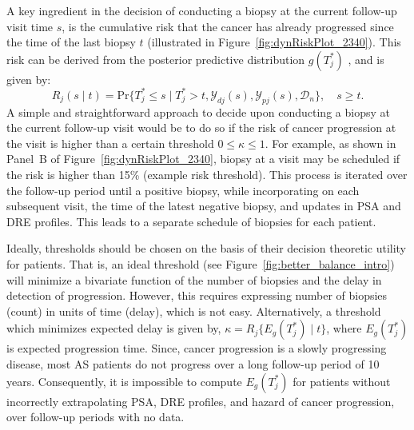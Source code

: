 A key ingredient in the decision of conducting a biopsy at the current follow-up visit time $s$, is the cumulative risk that the cancer has already progressed since the time of the last biopsy $t$ (illustrated in Figure~\ref{fig:dynRiskPlot_2340}). This risk can be derived from the posterior predictive distribution $g(T^*_j)$ \cite{rizopoulos2011dynamic}, and is given by:
\begin{equation*}
\label{eq:dynamic_risk_prob}
R_j(s \mid t) = \mbox{Pr}\big\{T^*_j \leq s \mid T^*_j > t, \mathcal{Y}_{dj}(s), \mathcal{Y}_{pj}(s), \mathcal{D}_n\big\}, \quad s \geq t.
\end{equation*}
A simple and straightforward approach to decide upon conducting a biopsy at the current follow-up visit would be to do so if the risk of cancer progression at the visit is higher than a certain threshold $0 \leq \kappa \leq 1$. For example, as shown in Panel~B of Figure~\ref{fig:dynRiskPlot_2340}, biopsy at a visit may be scheduled if the risk is higher than 15\% (example risk threshold). This process is iterated over the follow-up period until a positive biopsy, while incorporating on each subsequent visit, the time of the latest negative biopsy, and updates in PSA and DRE profiles. This leads to a separate schedule of biopsies for each patient.

Ideally, thresholds should be chosen on the basis of their decision theoretic utility for patients. That is, an ideal threshold (see Figure~\ref{fig:better_balance_intro}) will minimize a bivariate function of the number of biopsies and the delay in detection of progression. However, this requires expressing number of biopsies (count) in units of time (delay), which is not easy. Alternatively, a threshold which minimizes expected delay is given by, ${\kappa=R_j\{E_g(T^*_j) \mid t\}}$, where $E_g(T^*_j)$ is expected progression time. Since, cancer progression is a slowly progressing disease, most AS patients do not progress over a long follow-up period of 10 years. Consequently, it is impossible to compute $E_g(T^*_j)$ for patients without incorrectly extrapolating PSA, DRE profiles, and hazard of cancer progression, over follow-up periods with no data.


